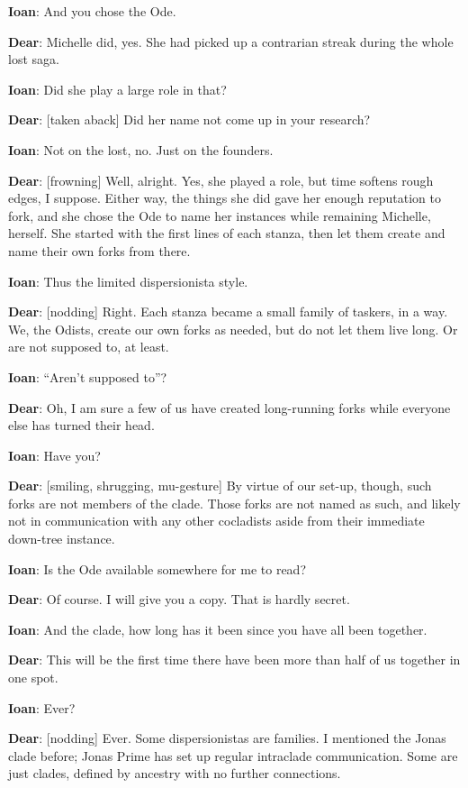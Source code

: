 \textbf{Ioan}: And you chose the Ode.

\textbf{Dear}: Michelle did, yes. She had picked up a contrarian streak during the whole lost saga.

\textbf{Ioan}: Did she play a large role in that?

\textbf{Dear}: {[}taken aback{]} Did her name not come up in your research?

\textbf{Ioan}: Not on the lost, no. Just on the founders.

\textbf{Dear}: {[}frowning{]} Well, alright. Yes, she played a role, but time softens rough edges, I suppose. Either way, the things she did gave her enough reputation to fork, and she chose the Ode to name her instances while remaining Michelle, herself. She started with the first lines of each stanza, then let them create and name their own forks from there.

\textbf{Ioan}: Thus the limited dispersionista style.

\textbf{Dear}: {[}nodding{]} Right. Each stanza became a small family of taskers, in a way. We, the Odists, create our own forks as needed, but do not let them live long. Or are not supposed to, at least.

\textbf{Ioan}: ``Aren't supposed to''?

\textbf{Dear}: Oh, I am sure a few of us have created long-running forks while everyone else has turned their head.

\textbf{Ioan}: Have you?

\textbf{Dear}: {[}smiling, shrugging, mu-gesture{]} By virtue of our set-up, though, such forks are not members of the clade. Those forks are not named as such, and likely not in communication with any other cocladists aside from their immediate down-tree instance.

\textbf{Ioan}: Is the Ode available somewhere for me to read?

\textbf{Dear}: Of course. I will give you a copy. That is hardly secret.

\textbf{Ioan}: And the clade, how long has it been since you have all been together.

\textbf{Dear}: This will be the first time there have been more than half of us together in one spot.

\textbf{Ioan}: Ever?

\textbf{Dear}: {[}nodding{]} Ever. Some dispersionistas are families. I mentioned the Jonas clade before; Jonas Prime has set up regular intraclade communication. Some are just clades, defined by ancestry with no further connections.

